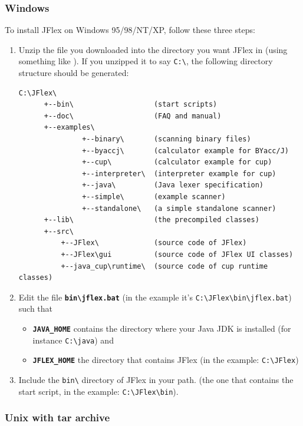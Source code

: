 \documentclass[11pt]{scrartcl}
\newcommand{\xsmall}{}
\begin{document}
\subsubsection{Windows\label{install:windows}}
To install JFlex on Windows 95/98/NT/XP, follow these three steps:
\begin{enumerate}
\item
Unzip the file you downloaded into the directory you want JFlex in (using
something like 
).
If you unzipped it to say \verb+C:\+, the following directory structure
should be generated:
{\xsmall
\begin{verbatim}
C:\JFlex\                          
      +--bin\                   (start scripts) 
      +--doc\                   (FAQ and manual)
      +--examples\ 
               +--binary\       (scanning binary files)
               +--byaccj\       (calculator example for BYacc/J)
               +--cup\          (calculator example for cup)
               +--interpreter\  (interpreter example for cup)
               +--java\         (Java lexer specification) 
               +--simple\       (example scanner)
               +--standalone\   (a simple standalone scanner) 
      +--lib\                   (the precompiled classes) 
      +--src\ 
          +--JFlex\             (source code of JFlex) 
          +--JFlex\gui          (source code of JFlex UI classes)
          +--java_cup\runtime\  (source code of cup runtime classes) 
\end{verbatim}
}

\item
Edit the file {\bf \verb+bin\jflex.bat+}
(in the example it's \verb+C:\JFlex\bin\jflex.bat+)
such that

\begin{itemize}
\item
  {\bf \texttt{JAVA\_HOME}} contains the directory where your Java JDK is installed
  (for instance \verb+C:\java+) and
\item
  {\bf \texttt{JFLEX\_HOME}} the directory that contains JFlex (in the example:
  \verb+C:\JFlex+) 
\end{itemize}
 
\item
Include the \verb+bin\+ directory of JFlex in your path.
(the one that contains the start script, in the example: \verb+C:\JFlex\bin+).
\end{enumerate}

\subsubsection{Unix with tar archive}
\end{document}
